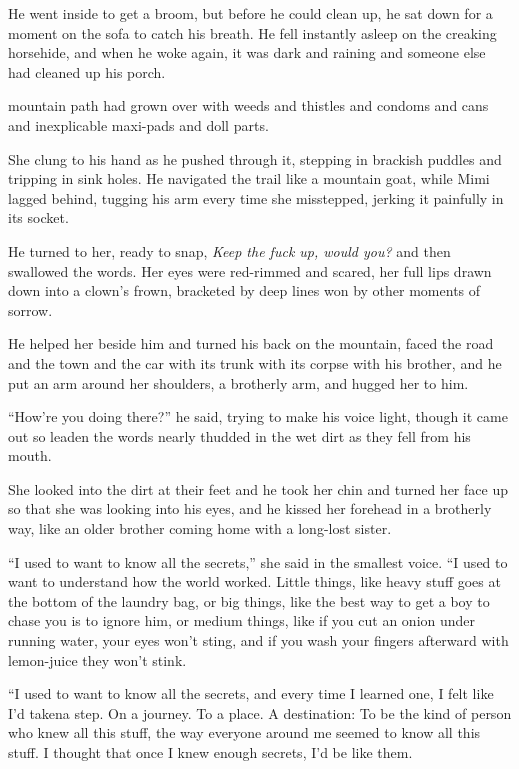 He went inside to get a broom, but before he could clean up, he sat
down for a moment on the sofa to catch his breath.  He fell instantly
asleep on the creaking horsehide, and when he woke again, it was dark
and raining and someone else had cleaned up his porch.

 mountain path had grown over with weeds and thistles and condoms
and cans and inexplicable maxi-pads and doll parts.

She clung to his hand as he pushed through it, stepping in brackish
puddles and tripping in sink holes.  He navigated the trail like a
mountain goat, while Mimi lagged behind, tugging his arm every time
she misstepped, jerking it painfully in its socket.

He turned to her, ready to snap, \textit{Keep the fuck up, would you?}
and then swallowed the words.  Her eyes were red-rimmed and scared,
her full lips drawn down into a clown's frown, bracketed by deep lines
won by other moments of sorrow.

He helped her beside him and turned his back on the mountain, faced
the road and the town and the car with its trunk with its corpse with
his brother, and he put an arm around her shoulders, a brotherly arm,
and hugged her to him.

``How're you doing there?'' he said, trying to make his voice light,
though it came out so leaden the words nearly thudded in the wet dirt
as they fell from his mouth.

She looked into the dirt at their feet and he took her chin and turned
her face up so that she was looking into his eyes, and he kissed her
forehead in a brotherly way, like an older brother coming home with a
long-lost sister.

``I used to want to know all the secrets,'' she said in the smallest
voice.  ``I used to want to understand how the world worked.  Little
things, like heavy stuff goes at the bottom of the laundry bag, or big
things, like the best way to get a boy to chase you is to ignore him,
or medium things, like if you cut an onion under running water, your
eyes won't sting, and if you wash your fingers afterward with
lemon-juice they won't stink.

``I used to want to know all the secrets, and every time I learned
one, I felt like I'd taken\dash{}a step.  On a journey.  To a place.  A
destination:  To be the kind of person who knew all this stuff, the
way everyone around me seemed to know all this stuff.  I thought that
once I knew enough secrets, I'd be like them.

